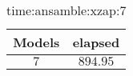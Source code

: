 \begin{table}[!ht]
	\centering
	\begin{tabular}{|c|c|}
		\hline
		Models & elapsed \\ \hline
		$7$ & $894.95$ \\ \hline
	\end{tabular}
	\caption{time:ansamble:xzap:7}
	\label{tab:time:ansamble:xzap:7}
\end{table}
